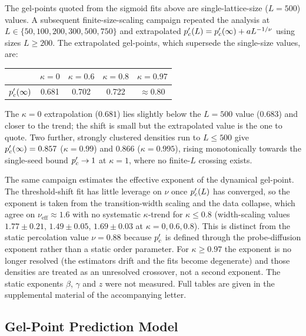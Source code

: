 The gel-points quoted from the sigmoid fits above are single-lattice-size ($L = 500$) values. A subsequent finite-size-scaling campaign repeated the analysis at $L \in \{50, 100, 200, 300, 500, 750\}$ and extrapolated $p_c'(L) = p_c'(\infty) + a L^{-1/\nu}$ using sizes $L \ge 200$. The extrapolated gel-points, which supersede the single-size values, are:

\begin{center}
\begin{tabular}{lcccc}
\hline
 & $\kappa = 0$ & $\kappa = 0.6$ & $\kappa = 0.8$ & $\kappa = 0.97$ \\
\hline
$p_c'(\infty)$ & 0.681 & 0.702 & 0.722 & $\approx 0.80$ \\
\hline
\end{tabular}
\end{center}

The $\kappa = 0$ extrapolation ($0.681$) lies slightly below the $L = 500$ value ($0.683$) and closer to the trend; the shift is small but the extrapolated value is the one to quote. Two further, strongly clustered densities run to $L \le 500$ give $p_c'(\infty) = 0.857$ ($\kappa = 0.99$) and $0.866$ ($\kappa = 0.995$), rising monotonically towards the single-seed bound $p_c' \to 1$ at $\kappa = 1$, where no finite-$L$ crossing exists.

The same campaign estimates the effective exponent of the dynamical gel-point. The threshold-shift fit has little leverage on $\nu$ once $p_c'(L)$ has converged, so the exponent is taken from the transition-width scaling and the data collapse, which agree on $\nu_{\mathrm{eff}} \approx 1.6$ with no systematic $\kappa$-trend for $\kappa \le 0.8$ (width-scaling values $1.77 \pm 0.21$, $1.49 \pm 0.05$, $1.69 \pm 0.03$ at $\kappa = 0, 0.6, 0.8$). This is distinct from the static percolation value $\nu = 0.88$ because $p_c'$ is defined through the probe-diffusion exponent rather than a static order parameter. For $\kappa \ge 0.97$ the exponent is no longer resolved (the estimators drift and the fits become degenerate) and those densities are treated as an unresolved crossover, not a second exponent. The static exponents $\beta$, $\gamma$ and $z$ were not measured. Full tables are given in the supplemental material of the accompanying letter.

\subsection{Gel-Point Prediction Model}

